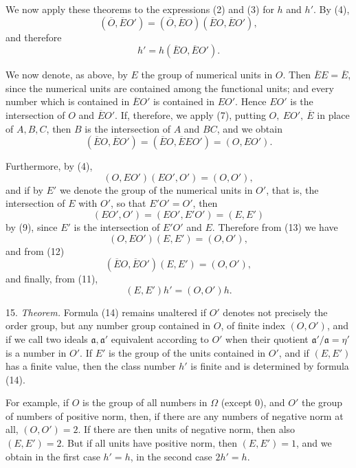 \documentclass[11pt]{article}
\begin{document}
We now apply these theorems to the expressions (2) and (3) for \(h\) and \(h'\). By (4),
\begin{equation}
 (\overline O,\overline EO')=(\overline O,\overline EO)(\overline EO,\overline EO'),
\tag{10}
\end{equation}
and therefore
\begin{equation}
 h'=h(\overline EO,\overline EO').
\tag{11}
\end{equation}

We now denote, as above, by \(E\) the group of numerical units in \(O\). Then \(\overline EE=\overline E\), since the numerical units are contained among the functional units; and every number which is contained in \(\overline EO'\) is contained in \(EO'\). Hence \(EO'\) is the intersection of \(O\) and \(\overline EO'\). If, therefore, we apply (7), putting \(O,\ EO',\ \overline E\) in place of \(A,B,C\), then \(B\) is the intersection of \(A\) and \(BC\), and we obtain
\begin{equation}
 (\overline EO,\overline EO')=(\overline EO,\overline EEO')=(O,EO').
\tag{12}
\end{equation}

Furthermore, by (4),
\begin{equation}
 (O,EO')(EO',O')=(O,O'),
\tag{13}
\end{equation}
and if by \(E'\) we denote the group of the numerical units in \(O'\), that is, the intersection of \(E\) with \(O'\), so that \(E'O'=O'\), then
\[
 (EO',O')=(EO',E'O')=(E,E')
\]
by (9), since \(E'\) is the intersection of \(E'O'\) and \(E\). Therefore from (13) we have
\[
 (O,EO')(E,E')=(O,O'),
\]
and from (12)
\[
 (\overline EO,\overline EO')(E,E')=(O,O'),
\]
and finally, from (11),
\begin{equation}
 (E,E')h'=(O,O')h.
\tag{14}
\end{equation}

15. \emph{Theorem.} Formula (14) remains unaltered if \(O'\) denotes not precisely the order group, but any number group contained in \(O\), of finite index \((O,O')\), and if we call two ideals \(\mathfrak a,\mathfrak a'\) equivalent according to \(O'\) when their quotient \(\mathfrak a'/\mathfrak a=\eta'\) is a number in \(O'\). If \(E'\) is the group of the units contained in \(O'\), and if \((E,E')\) has a finite value, then the class number \(h'\) is finite and is determined by formula (14).

For example, if \(O\) is the group of all numbers in \(\Omega\) (except \(0\)), and \(O'\) the group of numbers of positive norm, then, if there are any numbers of negative norm at all, \((O,O')=2\). If there are then units of negative norm, then also \((E,E')=2\). But if all units have positive norm, then \((E,E')=1\), and we obtain in the first case \(h'=h\), in the second case \(2h'=h\).
\end{document}
